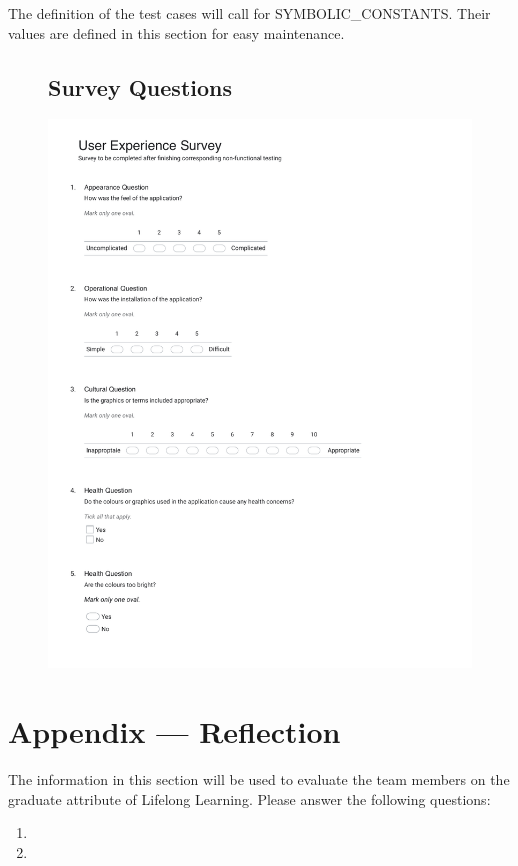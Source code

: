 \documentclass[12pt, titlepage]{article}
\begin{document}
The definition of the test cases will call for SYMBOLIC\_CONSTANTS.
Their values are defined in this section for easy maintenance.


\begin{figure}
  \subsection{Survey Questions}
  \centering
  \includegraphics[width=1\textwidth]{User Experience Survey.pdf}
\end{figure}


\newpage{}
\section*{Appendix --- Reflection}

The information in this section will be used to evaluate the team members on the
graduate attribute of Lifelong Learning.  Please answer the following questions:

\begin{enumerate}
  \item 
  \item 
\end{enumerate}
\end{document}
